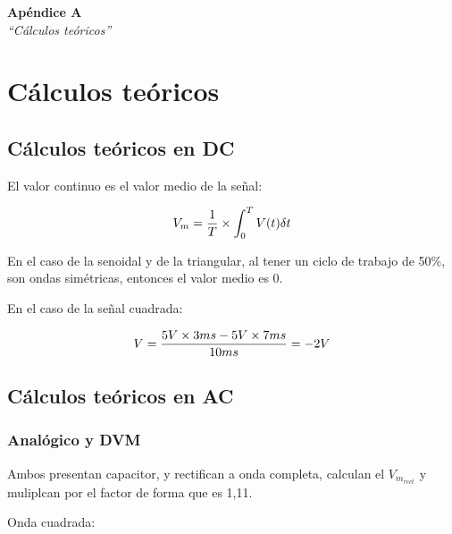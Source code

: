 \documentclass{article}
\begin{document}

\newpage
\vspace*{4cm}
\begin{center}
	\textbf{\Huge{Apéndice A}} \\
	\bigskip\bigskip
	\Large{\textit{``Cálculos teóricos''}}
\end{center}


\newpage \textit{}
\newpage


\newpage
\section{Cálculos teóricos}
\bigskip

\subsection{Cálculos teóricos en DC}

El valor continuo es el valor medio de la señal:

\begin{center}
\begin{equation}
V_{m} =  {{1}\over{T}} \times \int_{0}^{T} {V(t)} \delta t
\end{equation}
\end{center}
\bigskip

En el caso de la senoidal y de la triangular, al tener un ciclo de trabajo de 50\%, son ondas simétricas, entonces el valor medio es 0.

En el caso de la señal cuadrada:

\begin{center}
\begin{equation}
V =  {5V \times 3ms - 5V \times 7ms \over 10ms }= -2V
\end{equation}
\end{center}
\bigskip


\subsection{Cálculos teóricos en AC}

\subsubsection{Analógico y DVM}

Ambos presentan capacitor, y rectifican a onda completa, calculan el $V_{m_{rect}}$ y muliplcan por el factor de forma que es 1,11.

Onda cuadrada:
\end{document}
